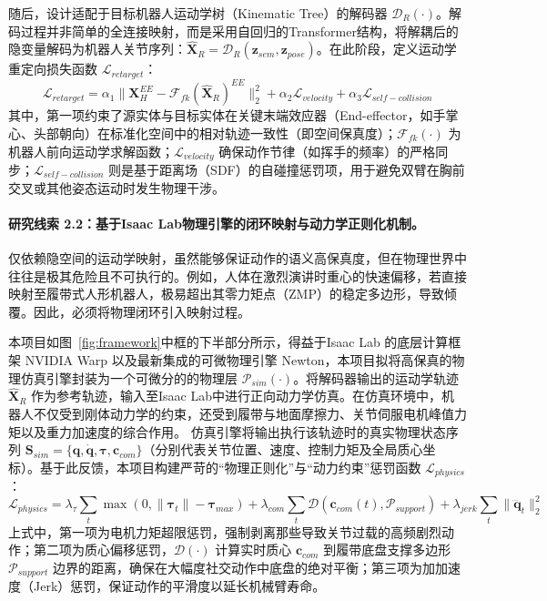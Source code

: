 随后，设计适配于目标机器人运动学树（Kinematic Tree）的解码器 $\mathcal{D}_R(\cdot)$。解码过程并非简单的全连接映射，而是采用自回归的Transformer结构，将解耦后的隐变量解码为机器人关节序列：$\hat{\mathbf{X}}_R = \mathcal{D}_R(\mathbf{z}_{sem}, \mathbf{z}_{pose})$。在此阶段，定义运动学重定向损失函数 $\mathcal{L}_{retarget}$：
\begin{equation}
\mathcal{L}_{retarget} = \alpha_1 \|\mathbf{X}_H^{EE} - \mathcal{F}_{fk}(\hat{\mathbf{X}}_R)^{EE}\|^2_2 + \alpha_2 \mathcal{L}_{velocity} + \alpha_3 \mathcal{L}_{self-collision}
\end{equation}
其中，第一项约束了源实体与目标实体在关键末端效应器（End-effector，如手掌心、头部朝向）在标准化空间中的相对轨迹一致性（即空间保真度）；$\mathcal{F}_{fk}(\cdot)$ 为机器人前向运动学求解函数；$\mathcal{L}_{velocity}$ 确保动作节律（如挥手的频率）的严格同步；$\mathcal{L}_{self-collision}$ 则是基于距离场（SDF）的自碰撞惩罚项，用于避免双臂在胸前交叉或其他姿态运动时发生物理干涉。

\paragraph{\textbf{研究线索 2.2：基于Isaac Lab物理引擎的闭环映射与动力学正则化机制。}}

仅依赖隐空间的运动学映射，虽然能够保证动作的语义高保真度，但在物理世界中往往是极其危险且不可执行的。例如，人体在激烈演讲时重心的快速偏移，若直接映射至履带式人形机器人，极易超出其零力矩点（ZMP）的稳定多边形，导致倾覆。因此，必须将物理闭环引入映射过程。

本项目如图~\ref{fig:framework}中框的下半部分所示，得益于Isaac Lab 的底层计算框架 NVIDIA Warp 以及最新集成的可微物理引擎 Newton，本项目拟将高保真的物理仿真引擎封装为一个可微分的的物理层 $\mathcal{P}_{sim}(\cdot)$。将解码器输出的运动学轨迹 $\hat{\mathbf{X}}_R$ 作为参考轨迹，输入至Isaac Lab中进行正向动力学仿真。在仿真环境中，机器人不仅受到刚体动力学的约束，还受到履带与地面摩擦力、关节伺服电机峰值力矩以及重力加速度的综合作用。
仿真引擎将输出执行该轨迹时的真实物理状态序列 $\mathbf{S}_{sim} = \{\mathbf{q}, \dot{\mathbf{q}}, \mathbf{\tau}, \mathbf{c}_{com}\}$（分别代表关节位置、速度、控制力矩及全局质心坐标）。基于此反馈，本项目构建严苛的“物理正则化”与“动力约束”惩罚函数 $\mathcal{L}_{physics}$：
\begin{equation}
\mathcal{L}_{physics} = \lambda_{\tau} \sum_{t} \max(0, \|\mathbf{\tau}_t\| - \mathbf{\tau}_{max}) + \lambda_{com} \sum_{t} \mathcal{D}(\mathbf{c}_{com}(t), \mathcal{P}_{support}) + \lambda_{jerk} \sum_{t} \|\dddot{\mathbf{q}}_t\|^2_2
\end{equation}
上式中，第一项为电机力矩超限惩罚，强制剥离那些导致关节过载的高频剧烈动作；第二项为质心偏移惩罚，$\mathcal{D}(\cdot)$ 计算实时质心 $\mathbf{c}_{com}$ 到履带底盘支撑多边形 $\mathcal{P}_{support}$ 边界的距离，确保在大幅度社交动作中底盘的绝对平衡；第三项为加加速度（Jerk）惩罚，保证动作的平滑度以延长机械臂寿命。

